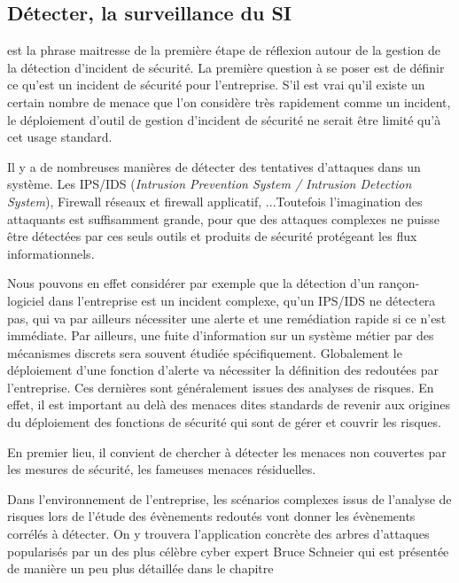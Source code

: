 \subsection{Détecter, la surveillance du SI}


 est la phrase maitresse de la première étape de réflexion autour de la gestion de la détection d'incident de sécurité.
La première question à se poser est  de définir ce qu'est un incident de sécurité pour l'entreprise. S'il est vrai qu'il existe un certain nombre de menace  que l'on considère très rapidement comme un incident, le déploiement d'outil de gestion d'incident de sécurité ne serait être limité qu'à cet usage standard.

Il y a de nombreuses manières de détecter des tentatives d'attaques dans un système. Les IPS/IDS (\textit{Intrusion Prevention System / Intrusion Detection System}), Firewall réseaux et firewall applicatif, ...Toutefois l'imagination des attaquants est suffisamment grande, pour que des attaques complexes ne puisse être détectées par ces seuls outils et produits de sécurité protégeant les flux informationnels.

Nous pouvons en effet considérer par exemple que la détection d'un rançon-logiciel dans l'entreprise est un incident complexe, qu'un IPS/IDS ne détectera pas,  qui va par ailleurs nécessiter une alerte et une remédiation rapide si ce n'est immédiate.
Par ailleurs,  une fuite d'information sur un système métier par des mécanismes discrets sera souvent étudiée spécifiquement.
Globalement le déploiement d'une fonction d'alerte va nécessiter la définition des  redoutées par l'entreprise. 
Ces dernières sont généralement issues des analyses de risques.
En effet, il est important au delà des menaces dites standards de revenir aux origines du déploiement des fonctions de sécurité qui sont de gérer et couvrir les risques.

En premier lieu, il convient de chercher à détecter les menaces non couvertes par les mesures de sécurité, les fameuses menaces résiduelles.

Dans l'environnement de l'entreprise, les scénarios complexes issus de l'analyse de risques lors de l'étude des évènements redoutés vont donner les évènements corrélés à détecter.
On y trouvera l'application concrète des arbres d'attaques popularisés par un des plus célèbre cyber expert Bruce Schneier \cite{schneier1999attack} qui est présentée de manière un peu plus détaillée dans le chapitre 

